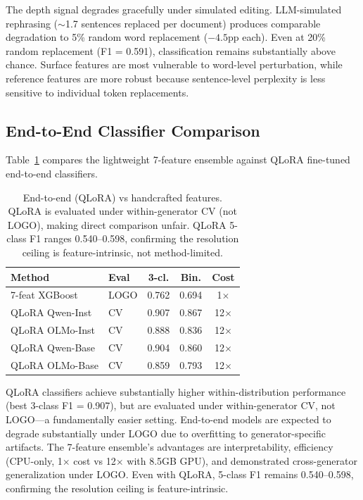 \documentclass[11pt,a4paper]{article}
\begin{document}
The depth signal degrades gracefully under simulated editing. LLM-simulated rephrasing (${\sim}$1.7 sentences replaced per document) produces comparable degradation to 5\% random word replacement ($-4.5$pp each). Even at 20\% random replacement (F1 = 0.591), classification remains substantially above chance. Surface features are most vulnerable to word-level perturbation, while reference features are more robust because sentence-level perplexity is less sensitive to individual token replacements.

\subsection{End-to-End Classifier Comparison}
\label{sec:e2e}

Table~\ref{tab:e2e} compares the lightweight 7-feature ensemble against QLoRA fine-tuned end-to-end classifiers.

\begin{table}[t]
\centering
\small
\begin{tabular}{llccc}
\toprule
\textbf{Method} & \textbf{Eval} & \textbf{3-cl.} & \textbf{Bin.} & \textbf{Cost} \\
\midrule
7-feat XGBoost & LOGO & 0.762 & 0.694 & 1$\times$ \\
QLoRA Qwen-Inst & CV & 0.907 & 0.867 & 12$\times$ \\
QLoRA OLMo-Inst & CV & 0.888 & 0.836 & 12$\times$ \\
QLoRA Qwen-Base & CV & 0.904 & 0.860 & 12$\times$ \\
QLoRA OLMo-Base & CV & 0.859 & 0.793 & 12$\times$ \\
\bottomrule
\end{tabular}
\caption{End-to-end (QLoRA) vs handcrafted features. QLoRA is evaluated under within-generator CV (not LOGO), making direct comparison unfair. QLoRA 5-class F1 ranges 0.540--0.598, confirming the resolution ceiling is feature-intrinsic, not method-limited.}
\label{tab:e2e}
\end{table}

QLoRA classifiers achieve substantially higher within-distribution performance (best 3-class F1 = 0.907), but are evaluated under within-generator CV, not LOGO---a fundamentally easier setting. End-to-end models are expected to degrade substantially under LOGO due to overfitting to generator-specific artifacts. The 7-feature ensemble's advantages are interpretability, efficiency (CPU-only, 1$\times$ cost vs 12$\times$ with 8.5GB GPU), and demonstrated cross-generator generalization under LOGO. Even with QLoRA, 5-class F1 remains 0.540--0.598, confirming the resolution ceiling is feature-intrinsic.
\end{document}

